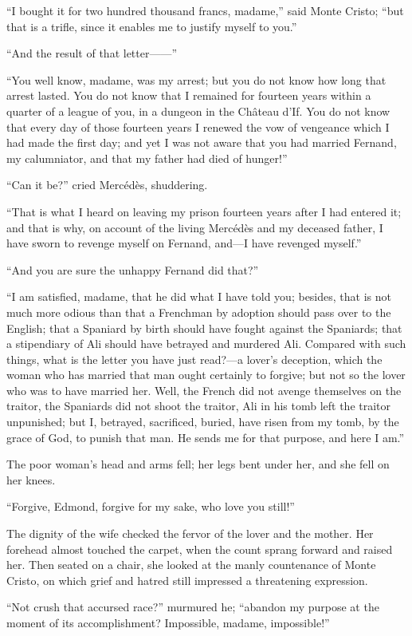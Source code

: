 “I bought it for two hundred thousand francs, madame,” said Monte
Cristo; “but that is a trifle, since it enables me to justify myself to
you.”

“And the result of that letter——”

“You well know, madame, was my arrest; but you do not know how long
that arrest lasted. You do not know that I remained for fourteen years
within a quarter of a league of you, in a dungeon in the Château d’If.
You do not know that every day of those fourteen years I renewed the
vow of vengeance which I had made the first day; and yet I was not
aware that you had married Fernand, my calumniator, and that my father
had died of hunger!”

“Can it be?” cried Mercédès, shuddering.

“That is what I heard on leaving my prison fourteen years after I had
entered it; and that is why, on account of the living Mercédès and my
deceased father, I have sworn to revenge myself on Fernand, and—I have
revenged myself.”

“And you are sure the unhappy Fernand did that?”

“I am satisfied, madame, that he did what I have told you; besides,
that is not much more odious than that a Frenchman by adoption should
pass over to the English; that a Spaniard by birth should have fought
against the Spaniards; that a stipendiary of Ali should have betrayed
and murdered Ali. Compared with such things, what is the letter you
have just read?—a lover’s deception, which the woman who has married
that man ought certainly to forgive; but not so the lover who was to
have married her. Well, the French did not avenge themselves on the
traitor, the Spaniards did not shoot the traitor, Ali in his tomb left
the traitor unpunished; but I, betrayed, sacrificed, buried, have risen
from my tomb, by the grace of God, to punish that man. He sends me for
that purpose, and here I am.”

The poor woman’s head and arms fell; her legs bent under her, and she
fell on her knees.

“Forgive, Edmond, forgive for my sake, who love you still!”

The dignity of the wife checked the fervor of the lover and the mother.
Her forehead almost touched the carpet, when the count sprang forward
and raised her. Then seated on a chair, she looked at the manly
countenance of Monte Cristo, on which grief and hatred still impressed
a threatening expression.

“Not crush that accursed race?” murmured he; “abandon my purpose at the
moment of its accomplishment? Impossible, madame, impossible!”

